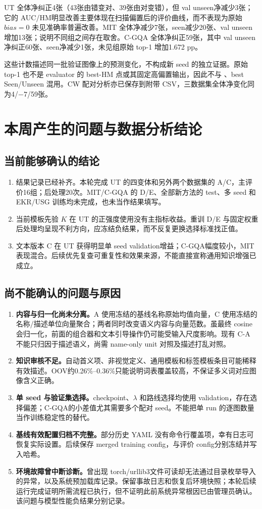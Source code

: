 \documentclass[12pt,a4paper,UTF8]{ctexart}
\newcommand{\file}[1]{\texttt{\detokenize{#1}}}
\begin{document}
UT 全体净纠正4张（43张由错变对、39张由对变错），但 val unseen净减少3张；它的 AUC/HM明显改善主要体现在扫描偏置后的评价曲线，而不表现为原始 $bias=0$ 未见准确率普遍改善。MIT 全体净减少7张，seen减少20张、val unseen增加13张；说明不同组之间存在取舍。C-GQA 全体净纠正59张，其中 val unseen净纠正60张、seen净减少1张，未见组原始 top-1 增加1.672 pp。

这些计数描述同一批验证图像上的预测变化，不构成新 seed 的独立证据。原始 top-1 也不是 evaluator 的 best-HM 点或其固定高偏置输出，因此不与 \file{closed_match}、best Seen/Unseen 混用。CW 配对分析亦已保存到附带 CSV，三数据集全体净变化同为4/$-7$/59张。
\section{本周产生的问题与数据分析结论}
\subsection{当前能够确认的结论}
\begin{enumerate}
\item 结果记录已经补齐。本轮完成 UT 的四变体和另外两个数据集的 A/C，主评价16组；后处理20次。MIT/C-GQA 的 D/E、全部新方法的 test、多 seed 和 EKR/USG 训练均未完成，也未当作结果填写。
\item 当前模板先验 $K$ 在 UT 的正强度使用没有主指标收益。重训 D/E 与固定权重后处理均呈现不利方向，应冻结负结果，而不反复更换选择标准找正值。
\item 文本版本 C 在 UT 获得明显单 seed validation增益；C-GQA幅度较小，MIT表现混合。后续优先复查可重复性和效果来源，不能直接宣称通用知识增强已成立。
\end{enumerate}
\subsection{尚不能确认的问题与原因}
\begin{enumerate}
\item \textbf{内容与归一化尚未分离。}A 使用冻结的基线名称原始均值向量，C 使用冻结的名称/描述单位向量聚合；两者同时改变语义内容与向量范数。虽最终 cosine 会归一化，前面的组合器和文本引导操作仍可能受输入尺度影响。现有 C-A 不能只归因于描述语义，尚需 name-only unit 对照及描述打乱对照。
\item \textbf{知识审核不足。}自动首义项、非视觉定义、通用模板和标签模板条目可能稀释有效描述。OOV约0.26\%--0.36\%只能说明词表覆盖较高，不保证多义词对应图像含义正确。
\item \textbf{单 seed 与验证集选择。}checkpoint、$\lambda$ 和路线选择均使用 validation，存在选择偏差；C-GQA的小差值尤其需要多个配对 seed。不能把单 run 的逐图数量当作训练稳定性的替代。
\item \textbf{基线有效配置归档不完整。}部分历史 YAML 没有命令行覆盖项，幸有日志可恢复实际设置。后续保存 merged training config，与评价 config分别冻结并写入哈希。
\item \textbf{环境故障曾中断诊断。}曾出现 torch/urllib3文件可读却无法通过目录枚举导入的异常，以及系统预加载库记录。保留事故日志和恢复后环境快照；本轮后续运行完成证明所需流程已执行，但不证明此前系统异常根因已由管理员确认。该问题与模型性能负结果分别记录。
\end{enumerate}
\end{document}
